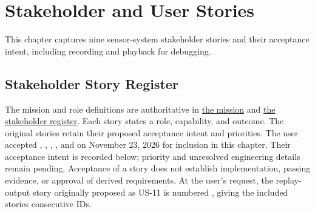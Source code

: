 \chapter{Stakeholder and User Stories}
\label{Section:UserStoriesResponsibility}
This chapter captures nine sensor-system stakeholder stories and their acceptance intent, including recording and playback for debugging.


\section{Stakeholder Story Register}
The mission and role definitions are authoritative in \hyperref[Section:MeasurementMission]{the mission} and \hyperref[Table:StakeholderNeeds]{the stakeholder register}. Each story states a role, capability, and outcome. The original stories retain their proposed acceptance intent and priorities. The user accepted , , , , and  on November 23, 2026 for inclusion in this chapter. Their acceptance intent is recorded below; priority and unresolved engineering details remain pending. Acceptance of a story does not establish implementation, passing evidence, or approval of derived requirements. At the user's request, the replay-output story originally proposed as US-11 is numbered , giving the included stories consecutive IDs.

